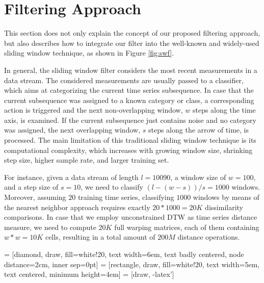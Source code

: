 \section{Filtering Approach} \label{filtering_approach}

This section does not only explain the concept of our proposed filtering approach, but also describes how to integrate our filter into the well-known and widely-used sliding window technique, as shown in Figure \ref{fig:swf}.

In general, the sliding window filter considers the most recent measurements in a data stream. The considered measurements are usually passed to a classifier, which aims at categorizing the current time series subsequence. In case that the current subsequence was assigned to a known category or class, a corresponding action is triggered and the next non-overlapping window, $w$ steps along the time axis, is examined. If the current subsequence just contains noise and no category was assigned, the next overlapping window, $s$ steps along the arrow of time, is processed. The main limitation of this traditional sliding window technique is its computational complexity, which increases with growing window size, shrinking step size, higher sample rate, and larger training set. %

For instance, given a data stream of length $l {=} 10090$, a window size of $w {=} 100$, and a step size of $s {=} 10$, we need to classify $(l - (w - s)) / s = 1000$ windows. Moreover, assuming $20$ training time series, classifying $1000$ windows by means of the nearest neighbor approach requires exactly $20*1000=20K$ dissimilarity comparisons. In case that we employ unconstrained DTW as time series distance measure, we need to compute $20K$ full warping matrices, each of them containing $w*w = 10K$ cells, resulting in a total amount of $200M$ distance operations.


 = [diamond, draw, fill=white!20, text width=6em, text badly centered, node distance=2cm, inner sep=0pt]
 = [rectangle, draw, fill=white!20, text width=5em, text centered, minimum height=4em]
 = [draw, -latex']

